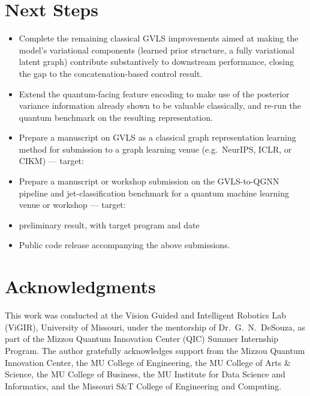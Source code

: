 \documentclass[11pt]{article}
\begin{document}
\section*{Next Steps}


\begin{itemize}
  \item Complete the remaining classical GVLS improvements aimed at making
    the model's variational components (learned prior structure, a
    fully variational latent graph) contribute substantively to
    downstream performance, closing the gap to the concatenation-based
    control result.
  \item Extend the quantum-facing feature encoding to make use of the
    posterior variance information already shown to be valuable
    classically, and re-run the quantum benchmark on the resulting
    representation.
  \item Prepare a manuscript on GVLS as a classical graph representation
    learning method for submission to a graph learning venue
    (e.g.\ NeurIPS, ICLR, or CIKM) --- target: %
  \item Prepare a manuscript or workshop submission on the GVLS-to-QGNN
    pipeline and jet-classification benchmark for a quantum machine
    learning venue or workshop --- target: %
  \item %
    preliminary result, with target program and date
  \item Public code release accompanying the above submissions.
\end{itemize}

\section*{Acknowledgments}

This work was conducted at the Vision Guided and Intelligent Robotics Lab
(ViGIR), University of Missouri, under the mentorship of
Dr.\ G.\ N.\ DeSouza, as part of the Mizzou Quantum Innovation Center (QIC)
Summer Internship Program. %
The author gratefully acknowledges support from the Mizzou Quantum
Innovation Center, the MU College of Engineering, the MU College of Arts
\& Science, the MU College of Business, the MU Institute for Data Science
and Informatics, and the Missouri S\&T College of Engineering and
Computing. %



\end{document}
